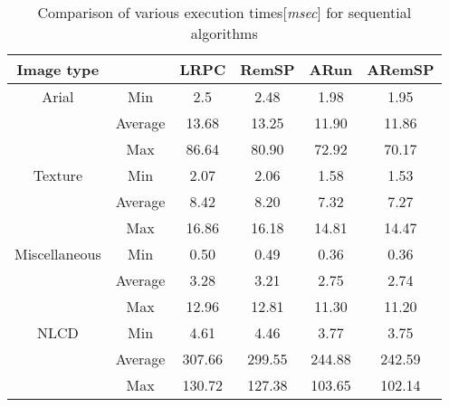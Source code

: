 \begin{table*}[ht]
\caption{Comparison of various execution times[{\em msec}] for sequential
algorithms}
\centering
\begin{tabular}{c c c c c c} 
\hline\hline
Image type &  & LRPC & RemSP & ARun & ARemSP\\ [0.5ex] 
\hline 
Arial & Min & 2.5 & 2.48 & 1.98 & 1.95 \\ 
 & Average & 13.68 & 13.25 & 11.90 & 11.86\\
 & Max & 86.64 & 80.90 & 72.92 & 70.17 \\
[1ex]
 \hline
Texture & Min &2.07 & 2.06 & 1.58 & 1.53 \\
 & Average & 8.42 & 8.20 & 7.32 & 7.27 \\
 & Max & 16.86 & 16.18 & 14.81 & 14.47\\
[1ex]
 \hline
Miscellaneous & Min & 0.50 & 0.49 & 0.36 & 0.36\\
 & Average & 3.28 & 3.21 & 2.75 & 2.74 \\
 & Max &12.96 & 12.81 & 11.30 & 11.20\\
 [1ex]
\hline
NLCD & Min & 4.61 & 4.46	& 3.77 & 3.75 \\
& Average & 307.66 & 299.55 & 244.88 & 242.59 \\
& Max & 130.72 & 127.38 & 103.65 & 102.14 \\[1ex]
\hline
\end{tabular}
\label{table:seq} 
\end{table*}
